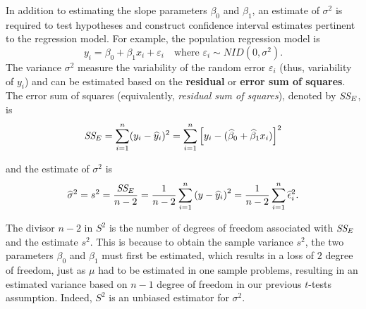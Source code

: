 In addition to estimating the slope parameters $\beta_0$ and $\beta_1$, an estimate of $\sigma^2$ is required to test hypotheses and 
construct confidence interval estimates pertinent to the regression model. For example, the population regression model is 
\begin{equation}
    y_i = \beta_0 + \beta_1 x_i + \varepsilon_i \quad \text{where } \varepsilon_i \sim NID(0, \sigma^2).
\end{equation}
The variance $\sigma^2$ measure the variability of the random error $\varepsilon_i$ (thus, variability of $y_i$) and can be estimated based on the 
\textbf{residual} or \textbf{error sum of squares}. The error sum of squares (equivalently, \textit{residual sum of squares}), denoted by $\textit{SS}_{E}$, is 
\begin{equation}
    \textit{SS}_{E} = \sum_{i=1}^{n} (y_i - \widehat{y}_i)^2 = \sum_{i=1}^n \left[y_i - (\widehat{\beta}_0 + \widehat{\beta}_1 x_i ) \right]^2
\end{equation}

and the estimate of $\sigma^2$ is 
\begin{equation}
    \widehat{\sigma}^2 = s^2 = \frac{\textit{SS}_{E}}{n-2} = \frac{1}{n-2} \sum_{i=1}^n \left(y - \widehat{y}_i \right)^2
    = \frac{1}{n-2} \sum_{i=1}^{n} \widehat{\epsilon}_i^2.
\end{equation}

The divisor $n - 2$ in $S^2$ is the number of degrees of freedom associated with $\textit{SS}_{E}$ and the estimate 
$s^2$. This is because to obtain the sample variance $s^2$, the two parameters $\beta_0$ and $\beta_1$ must 
first be estimated, which results in a loss of $2$ degree of freedom, just as $\mu$ had to 
be estimated in one sample problems, resulting in an estimated variance based on $n-1$ 
degree of freedom in our previous $t$-tests assumption. Indeed, $S^2$ is an unbiased estimator for $\sigma^2$.

